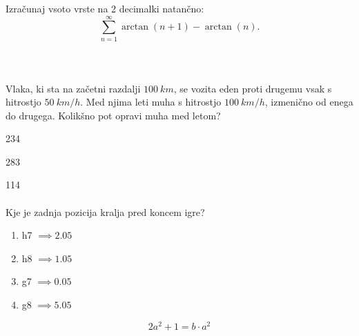\documentclass[a4paper]{article}
\begin{document}
Izračunaj vsoto vrste na 2 decimalki natančno:
$$\sum_{n=1}^{\infty}\arctan(n+1)-\arctan(n).$$\\
\\
\\



Vlaka, ki sta na začetni razdalji $100~km$, se vozita eden proti drugemu vsak s hitrostjo $50~km/h$. 
Med njima leti muha s hitrostjo $100~km/h$, 
izmenično od enega do drugega. Kolikšno pot opravi muha med letom?


234



283


114\\
\\






Kje je zadnja pozicija kralja pred koncem igre?
\begin{enumerate}
    \item h7 $\implies 2.05$
   \item h8 $\implies 1.05$
   \item  g7 $\implies 0.05$
   \item g8 $\implies 5.05$
\end{enumerate}
\newpage

    \[2a^2+1=b\cdot a^2\]
\end{document}

